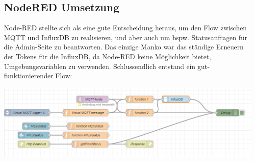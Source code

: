 \subsection{NodeRED Umsetzung}
Node-RED stellte sich als eine gute Entscheidung heraus, um den Flow zwischen MQTT und InfluxDB zu realisieren, und aber auch um bspw. Statusanfragen für die Admin-Seite zu beantworten.
Das einzige Manko war das ständige Erneuern der Tokens für die InfluxDB, da Node-RED keine Möglichkeit bietet, Umgebungsvariablen zu verwenden.
Schlussendlich entstand ein gut-funktionierender Flow:
\begin{center}
  \includegraphics[width=1\textwidth]{../images/UI/flow.png}
\end{center}


